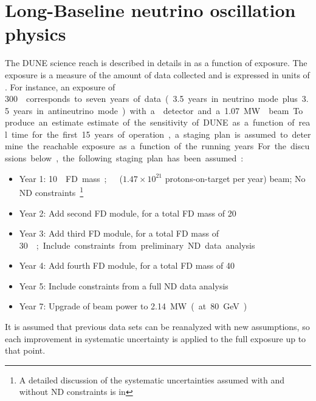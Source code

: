 \section{Long-Baseline neutrino oscillation physics}

The DUNE science reach is described in details in \volphys as a
function of exposure.  The exposure is a measure of the amount of data
collected and is expressed in units of \ktMWyr{}. For instance, an
exposure of \SI{300}\ktMWyr{} corresponds to seven years of data
(\num{3.5} years in neutrino mode plus \num{3.5} years in antineutrino
mode) with a  detector and a \SI{1.07}\MW{} beam.

To produce an estimate estimate of the sensitivity of DUNE as a 
function of real time
for the first \num{15} years of operation, a staging plan is assumed 
to determine the reachable
exposure as a function of the running years. For the discussions below,
the following staging plan has
been assumed:
\begin{itemize}
\item Year 1: \SI{10}\kt{} FD mass;   ($1.47 \times 10^{21}$ protons-on-target per year) beam; No ND
  constraints~\footnote{A detailed discussion of the systematic uncertainties assumed
 with and without ND constraints is in \volphys}
\item Year 2: Add second  FD module, for a total FD mass of
  \SI{20}\kt
\item Year 3: Add third  FD module, for a total FD mass of
  \SI{30}\kt; Include constraints from preliminary ND data analysis
\item Year 4: Add fourth  FD module, for a total FD mass of
  \SI{40}\kt
\item Year 5: Include constraints from a full ND data analysis 
 \item Year 7: Upgrade of beam power to \SI{2.14}\MW (at \SI{80}\GeV)
\end{itemize}
It is assumed that previous data sets can be reanalyzed with new
assumptions, so each improvement in systematic uncertainty is applied
to the full exposure up to that point.

